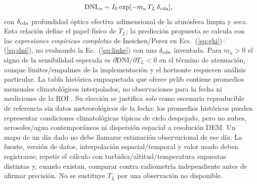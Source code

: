 \documentclass[11pt,a4paper]{article}
\begin{document}
\begin{equation}
 \mathrm{DNI}_{\rm cs}\sim I_0\exp[-m_a\,T_L\,\delta_{\rm cda}],\label{eq:linke}
\end{equation}
con $\delta_{\rm cda}$ profundidad óptica efectiva adimensional de la atmósfera limpia y seca. Esta relación define el papel físico de $T_L$; la predicción propuesta se calcula con las \emph{expresiones empíricas completas} de Ineichen/Perez en Ecs.~(\ref{eq:ghi})--(\ref{eq:dni}), no evaluando la Ec.~(\ref{eq:linke}) con una $\delta_{\rm cda}$ inventada. Para $m_a>0$ el signo de la sensibilidad esperada es $\partial\mathrm{DNI}/\partial T_L<0$ en el término de atenuación, aunque límites/empalmes de la implementación y el horizonte requieren análisis particular. La tabla histórica empaquetada que ofrece pvlib contiene promedios mensuales climatológicos interpolados, no observaciones para la fecha ni mediciones de la ROI \cite{pvliblinke}. Su elección se justifica \emph{solo} como escenario reproducible de referencia sin datos meteorológicos de la fecha: los promedios históricos pueden representar condiciones climatológicas típicas de cielo despejado, pero no nubes, aerosoles/agua contemporáneos ni dispersión espacial a resolución DEM. Un mapa de un día dado no debe llamarse estimación observacional de ese día. La fuente, versión de datos, interpolación espacial/temporal y valor usado deben registrarse; repetir el cálculo con turbidez/altitud/temperatura supuestas distintas y, cuando existan, comparar contra radiometría independiente antes de afirmar precisión. No se sustituye $T_L$ por una observación no disponible.
\end{document}
